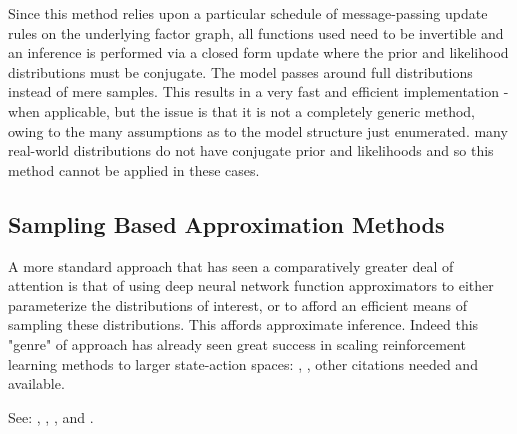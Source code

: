 \documentclass[onecolumn]{IEEEtran}
\begin{document}
Since this method relies upon a particular schedule of message-passing update rules on the underlying factor graph, all functions used need to be invertible and an inference is performed via a closed form update where the prior and likelihood distributions must be conjugate. The model passes around full distributions instead of mere samples. This results in a very fast and efficient implementation - when applicable, but the issue is that it is not a completely generic method, owing to the many assumptions as to the model structure just enumerated. many real-world distributions do not have conjugate prior and likelihoods and so this method cannot be applied in these cases.


\subsection{Sampling Based Approximation Methods}

A more standard approach that has seen a comparatively greater deal of attention is that of using deep neural network function approximators to either parameterize the distributions of interest, or to afford an efficient means of sampling these distributions. This affords approximate inference. Indeed this "genre" of approach has already seen great success in scaling reinforcement learning methods to larger state-action spaces: \textcite{Async-Methods-Deep-RL}, \textcite{ATARI-Deep-RL}, other citations needed and available.

See: \textcite{Deep-AIF}, \textcite{Applications-of-FEP-Machine-Learning-Neuroscience}, \textcite{Deep-AIF-As-Var-Policy-Grad}, \textcite{Reinforcement-Learning-Through-AIF} and \textcite{Bayesian-Policy-Selection-Using-AIF}. 
\end{document}
